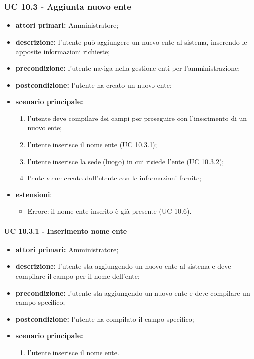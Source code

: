 			\subsubsection{UC 10.3 - Aggiunta nuovo ente}
			\begin{itemize}
				\item \textbf{attori primari:} Amministratore;
				\item \textbf{descrizione:} l'utente può aggiungere un nuovo ente al sistema, inserendo le apposite informazioni richieste;
				\item \textbf{precondizione:} l'utente naviga nella gestione enti per l'amministrazione;
				\item \textbf{postcondizione:} l'utente ha creato un nuovo ente;
				\item \textbf{scenario principale:}
				\begin{enumerate}
					\item{l'utente deve compilare dei campi per proseguire con l'inserimento di un nuovo ente;}
					\item l'utente inserisce il nome ente (UC 10.3.1);
					\item l'utente inserisce la sede (luogo) in cui risiede l'ente (UC 10.3.2);
					\item{l'ente viene creato dall'utente con le informazioni fornite;}
				\end{enumerate}	
				\item \textbf{estensioni:}
					\begin{itemize}
						\item Errore: il nome ente inserito è già presente (UC 10.6).
					\end{itemize}
			\end{itemize}	

				\paragraph{UC 10.3.1 - Inserimento nome ente}
				\begin{itemize}
					\item \textbf{attori primari:} Amministratore;
					\item \textbf{descrizione:} l'utente sta aggiungendo un nuovo ente al sistema e deve compilare il campo per il nome dell'ente;
					\item \textbf{precondizione:} l'utente sta aggiungendo un nuovo ente e deve compilare un campo specifico;
					\item \textbf{postcondizione:} l'utente ha compilato il campo specifico;
					\item \textbf{scenario principale:}
					\begin{enumerate}
						\item l'utente inserisce il nome ente.
					\end{enumerate}	
				\end{itemize}	

